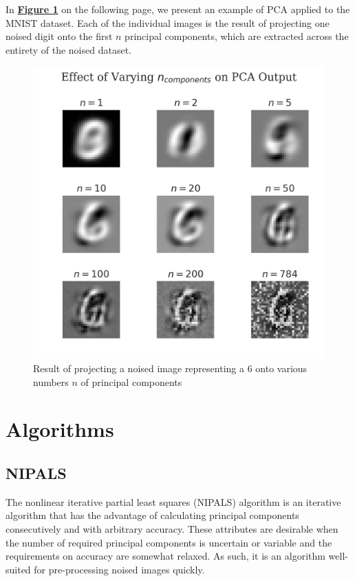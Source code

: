\documentclass[12pt]{article}
\begin{document}
In \textbf{\hyperref[PCA]{Figure \ref*{PCA}}} on the following page, we present an example of PCA applied to the MNIST dataset. Each of the individual images is the result of projecting one noised digit onto the first $n$ principal components, which are extracted across the entirety of the noised dataset.

\begin{figure}[H]
\begin{center}
\includegraphics[width=\textwidth]{set_10.png}
\caption{Result of projecting a noised image representing a $6$ onto various numbers $n$ of principal components}
\label{PCA}
\end{center}
\end{figure}

\pagebreak
\section{Algorithms}\label{3}

\subsection{NIPALS}\label{3.1}
The nonlinear iterative partial least squares (NIPALS) algorithm is an iterative algorithm that has the advantage of calculating principal components consecutively and with arbitrary accuracy. These attributes are desirable when the number of required principal components is uncertain or variable and the requirements on accuracy are somewhat relaxed. As such, it is an algorithm well-suited for pre-processing noised images quickly.
\end{document}
